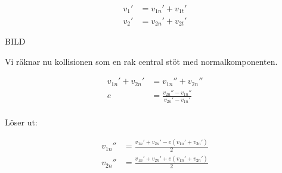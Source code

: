 \documentclass[11pt]{article} %
\begin{document}
 \begin{align}\label{vCollision}
v_1'& = v_{1n}' + v_{1t}'\\
v_2'& = v_{2n}' + v_{2t}'
 \end{align}

BILD

Vi räknar nu kollisionen som en rak central stöt med normalkomponenten. 

 \begin{align}\label{vCollision}
 v_{1n}' + v_{2n}'& = v_{1n}'' + v_{2n}''\\
 e& = \frac{v_{2n}''-v_{1n}''}{v_{2n}'-v_{1n}'}\\
 \end{align}

Löser ut: 

 \begin{align}\label{vCollision}
 v_{1n}''& = \frac{v_{1n}' + v_{2n}'  - e(v_{1n}' + v_{2n}')}{2} \\
 v_{2n}''& = \frac{v_{1n}' + v_{2n}'  + e(v_{1n}' + v_{2n}')}{2} 
 \end{align}

\pagebreak
\end{document}
